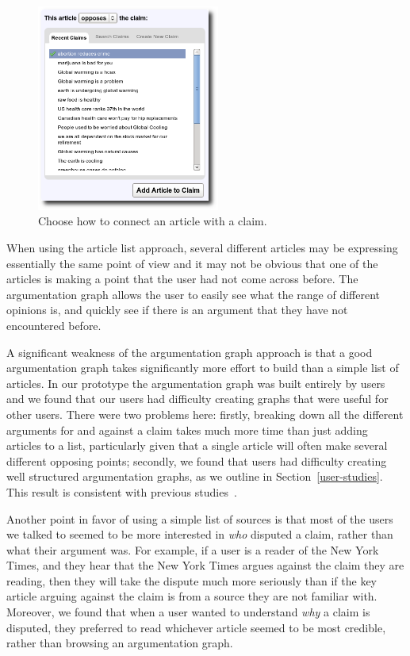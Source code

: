 \documentclass{www2010-submission}
\newcommand{\todo}[1]{}
\begin{document}
\begin{figure}[tb]
	\begin{center}
	\includegraphics[width=6cm]{pictures/article_choose_claim.png}
	\caption{Choose how to connect an article with a claim.}
	\label{article_choose}
	\end{center}
\end{figure}

\todo{Call them supporting pages? Naming is a mess right now.}

When using the article list approach, several different articles may be expressing essentially the same point of view and it may not be obvious that one of the articles is making a point that the user had not come across before. The argumentation graph allows the user to easily see what the range of different opinions is, and quickly see if there is an argument that they have not encountered before. 

A significant weakness of the argumentation graph approach is that a good argumentation graph takes significantly more effort to build than a simple list of articles. In our prototype the argumentation graph was built entirely by users and we found that our users had difficulty creating graphs that were useful for other users. There were two problems here: firstly, breaking down all the different arguments for and against a claim takes much more time than just adding articles to a list, particularly given that a single article will often make several different opposing points; secondly, we found that users had difficulty creating well structured argumentation graphs, as we outline in Section~\ref{user-studies}. This result is consistent with previous studies~\cite{Isenmann1997}.

Another point in favor of using a simple list of sources is that most of the users we talked to seemed to be more interested in {\it who} disputed a claim, rather than what their argument was. For example, if a user is a reader of the New York Times, and they hear that the New York Times argues against the claim they are reading, then they will take the dispute much more seriously than if the key article arguing against the claim is from a source they are not familiar with. Moreover, we found that when a user wanted to understand {\it why} a claim is disputed, they preferred to read whichever article seemed to be most credible, rather than browsing an argumentation graph.
\end{document}
